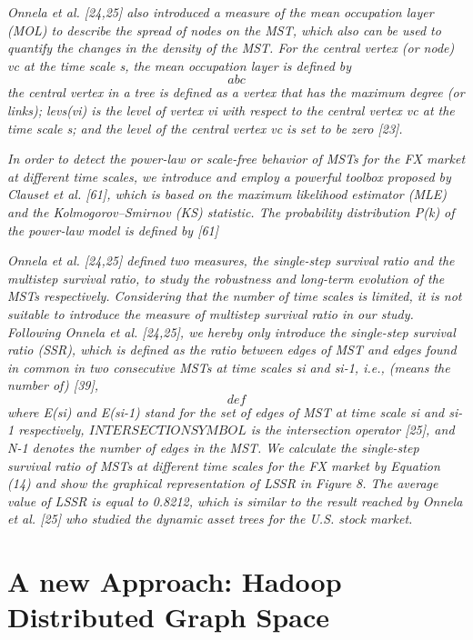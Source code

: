 \documentclass[a4paper,10pt]{scrbook}
\begin{document}
\textit{Onnela et al. [24,25] also introduced a measure of the mean occupation layer (MOL) to describe the spread of nodes on the MST, which also can be used to quantify the changes in the density of the MST. For the central vertex (or node) vc at the time scale s, the mean occupation layer is defined by}
\begin{equation}
abc
\end{equation}
\textit{the central vertex in a tree is defined as a vertex that has the maximum degree (or links); levs(vi)
is the level of vertex vi with respect to the central vertex vc at the time scale s; and the level of the central vertex vc is set to be zero [23].}




\textit{In order to detect the power-law or scale-free behavior of MSTs for the FX market at
different time scales, we introduce and employ a powerful toolbox proposed by Clauset et al. [61], which is based on the maximum likelihood estimator (MLE) and the Kolmogorov–Smirnov (KS) statistic. The probability distribution P(k) of the power-law model is defined by [61]}




\textit{Onnela et al. [24,25] defined two measures, the single-step survival ratio and the multistep survival
ratio, to study the robustness and long-term evolution of the MSTs respectively. Considering that the number of time scales is limited, it is not suitable to introduce the measure of multistep survival ratio in our study. Following Onnela et al. [24,25], we hereby only introduce the single-step survival ratio (SSR), which is defined as the ratio between edges of MST and edges found in common in two consecutive MSTs at time scales si and si-1, i.e., (means the number of) [39],}
\begin{equation}
def
\end{equation}
\textit{where E(si) and E(si-1) stand for the set of edges of MST at time scale si and si-1 respectively, $INTERSECTION SYMBOL$ is the intersection operator [25], and N-1 denotes the number of edges in the MST.
We calculate the single-step survival ratio of MSTs at different time scales for the FX market by
Equation (14) and show the graphical representation of LSSR in Figure 8. The average value of LSSR is equal to 0.8212, which is similar to the result reached by Onnela et al. [25] who studied the dynamic asset trees for the U.S. stock market.}


\section{A new Approach: Hadoop Distributed Graph Space}
\end{document}
